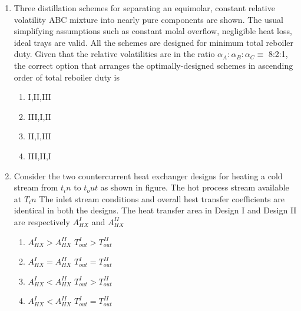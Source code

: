 \documentclass[journal,12pt,onecolumn]{IEEEtran}
\theoremstyle{remark}
\begin{document}
\begin{enumerate}
    \item Three distillation schemes for separating an equimolar, constant relative volatility ABC mixture into nearly pure components are shown. The usual simplifying assumptions such as constant molal overflow, negligible heat loss, ideal trays are valid. All the schemes are designed for minimum total reboiler duty. Given that the relative volatilities are in the ratio $\alpha_A:\alpha_B:\alpha_C \equiv$ 8:2:1, the correct option that arranges the optimally-designed schemes in ascending order of total reboiler duty is
\begin{multicols}{3}
 
 


\end{multicols}

\begin{multicols}{4}
    \begin{enumerate}
        \item I,II,III
        \item III,I,II
        \item II,I,III
        \item III,II,I
    \end{enumerate}
\end{multicols}

    \item Consider the two countercurrent heat exchanger designs for heating a cold stream from $t_in$ to $t_out$ as shown in figure. The hot process stream available at $T_in$ The inlet stream conditions and overall hest transfer coefficients are identical in both the designs. The heat transfer area in Design I and Design II are respectively $A^{I}_{HX}$ and $A^{II}_{HX}$ \\

    
\begin{enumerate}
     \item $A^{I}_{HX} > A^{II}_{HX}$ \hspace{5pt} $T^{I}_{out} > T^{II}_{out}$
    \item $A^{I}_{HX} = A^{II}_{HX}$ \hspace{5pt}  $T^{I}_{out} = T^{II}_{out}$
    \item $A^{I}_{HX} < A^{II}_{HX}$ \hspace{5pt}  $T^{I}_{out} > T^{II}_{out}$
    \item $A^{I}_{HX} < A^{II}_{HX}$  \hspace{5pt}  $T^{I}_{out} = T^{II}_{out}$
\end{enumerate} 


\end{enumerate}
\end{document}
